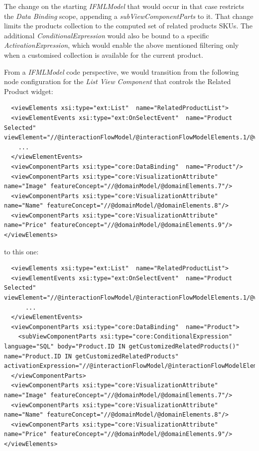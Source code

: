 The change on the starting \textit{IFMLModel} that would occur in that case restricts the \textit{Data Binding} scope, appending a \textit{subViewComponentParts} to it. That change limits the products collection to the computed set of related products SKUs. The additional \textit{ConditionalExpression} would also be bound to a specific \textit{ActivationExpression}, which would enable the above mentioned filtering only when a customised collection is available for the current product. 

From a \textit{IFMLModel} code perspective, we would transition from the following node configuration for the \textit{List View Component} that controls the Related Product widget:

\vspace{0.5cm}
\lstset{language=XML}
\begin{lstlisting} 
  <viewElements xsi:type="ext:List"  name="RelatedProductList">
  <viewElementEvents xsi:type="ext:OnSelectEvent"  name="Product Selected" viewElement="//@interactionFlowModel/@interactionFlowModelElements.1/@viewElements.2">
    ...
  </viewElementEvents>
  <viewComponentParts xsi:type="core:DataBinding"  name="Product"/>
  <viewComponentParts xsi:type="core:VisualizationAttribute"  name="Image" featureConcept="//@domainModel/@domainElements.7"/>
  <viewComponentParts xsi:type="core:VisualizationAttribute"  name="Name" featureConcept="//@domainModel/@domainElements.8"/>
  <viewComponentParts xsi:type="core:VisualizationAttribute"  name="Price" featureConcept="//@domainModel/@domainElements.9"/>
</viewElements>
\end{lstlisting}
\vspace{0.5cm}

to this one:

\vspace{0.5cm}
\lstset{language=XML}
\begin{lstlisting} 
  <viewElements xsi:type="ext:List"  name="RelatedProductList">
  <viewElementEvents xsi:type="ext:OnSelectEvent"  name="Product Selected" viewElement="//@interactionFlowModel/@interactionFlowModelElements.1/@viewElements.2">
      ...
  </viewElementEvents>
  <viewComponentParts xsi:type="core:DataBinding"  name="Product">
    <subViewComponentParts xsi:type="core:ConditionalExpression"  language="SQL" body="Product.ID IN getCustomizedRelatedProducts()" name="Product.ID IN getCustomizedRelatedProducts" activationExpression="//@interactionFlowModel/@interactionFlowModelElements.17"/>
  </viewComponentParts>
  <viewComponentParts xsi:type="core:VisualizationAttribute"  name="Image" featureConcept="//@domainModel/@domainElements.7"/>
  <viewComponentParts xsi:type="core:VisualizationAttribute"  name="Name" featureConcept="//@domainModel/@domainElements.8"/>
  <viewComponentParts xsi:type="core:VisualizationAttribute"  name="Price" featureConcept="//@domainModel/@domainElements.9"/>
</viewElements>
\end{lstlisting}
\vspace{0.5cm}

